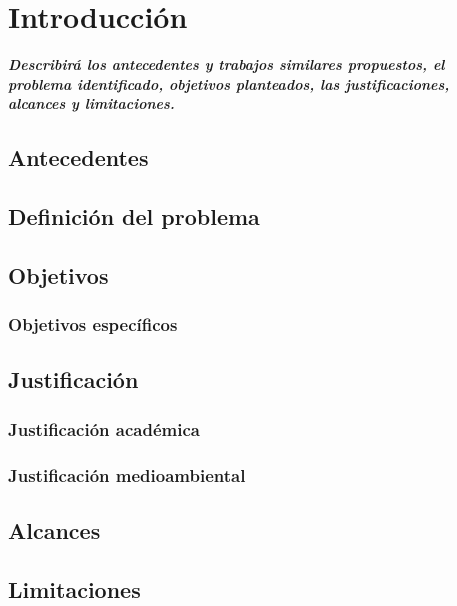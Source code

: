 \chapter{Introducción}\label{ch:ThesisIntro}

\textit{\textbf{Describirá los antecedentes y trabajos similares propuestos, el problema identificado, objetivos planteados, las justificaciones, alcances y limitaciones.}}

\section{Antecedentes}
\section{Definición del problema}
\section{Objetivos}
	\subsection*{Objetivos específicos}	
\section{Justificación}
	\subsection*{Justificación académica}	
	\subsection*{Justificación medioambiental}	
\section*{Alcances}
\section*{Limitaciones}


